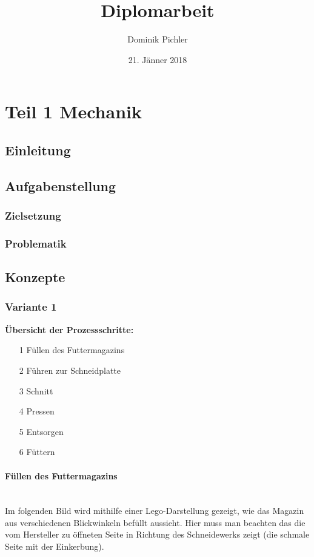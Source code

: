 \documentclass[a4paper,12pt]{scrartcl}
\title{Diplomarbeit}
\author{Dominik Pichler}
\date{21. Jänner 2018}
\begin{document}
\maketitle
\setcounter{tocdepth}{5}
\setcounter{secnumdepth}{4}
\tableofcontents

\section{Teil 1 Mechanik}
\subsection{Einleitung}
\subsection{Aufgabenstellung}
\subsubsection{Zielsetzung}
\subsubsection{Problematik}
\newpage
\subsection{Konzepte} 



\subsubsection{Variante 1} 
\textbf{Übersicht der Prozessschritte:}
\begin{itemize}
\item[1] Füllen des Futtermagazins
\item[2] Führen zur Schneidplatte
\item[3] Schnitt
\item[4] Pressen
\item[5] Entsorgen
\item[6] Füttern
\end{itemize}

\paragraph{Füllen des Futtermagazins}$~~$\\

Im folgenden Bild wird mithilfe einer Lego-Darstellung gezeigt, wie das Magazin aus verschiedenen Blickwinkeln befüllt aussieht. Hier muss man beachten das die vom Hersteller zu öffneten Seite in Richtung des Schneidewerks zeigt (die schmale Seite mit der Einkerbung).
\end{document}
